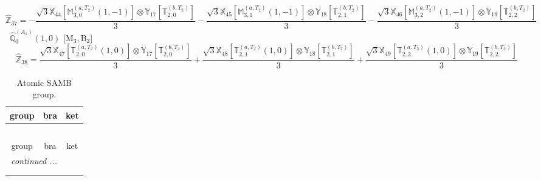 \documentclass[fleqn,10pt,landscape]{article}
\begin{document}
\begin{itemize}
\begin{dmath*}
\hat{\mathbb{Z}}_{37}=- \frac{\sqrt{3} \mathbb{X}_{44}[\mathbb{M}_{3,0}^{(a,T_{2})}(1,-1)] \otimes\mathbb{Y}_{17}[\mathbb{T}_{2,0}^{(b,T_{2})}]}{3} - \frac{\sqrt{3} \mathbb{X}_{45}[\mathbb{M}_{3,1}^{(a,T_{2})}(1,-1)] \otimes\mathbb{Y}_{18}[\mathbb{T}_{2,1}^{(b,T_{2})}]}{3} - \frac{\sqrt{3} \mathbb{X}_{46}[\mathbb{M}_{3,2}^{(a,T_{2})}(1,-1)] \otimes\mathbb{Y}_{19}[\mathbb{T}_{2,2}^{(b,T_{2})}]}{3}
\end{dmath*}
\vspace{4mm}
\noindent {} $\,\,\,\hat{\mathbb{Q}}_{0}^{(A_{1})}(1,0)$ [M$_{3}$,\,B$_{2}$]
\begin{dmath*}
\hat{\mathbb{Z}}_{38}=\frac{\sqrt{3} \mathbb{X}_{47}[\mathbb{T}_{2,0}^{(a,T_{2})}(1,0)] \otimes\mathbb{Y}_{17}[\mathbb{T}_{2,0}^{(b,T_{2})}]}{3} + \frac{\sqrt{3} \mathbb{X}_{48}[\mathbb{T}_{2,1}^{(a,T_{2})}(1,0)] \otimes\mathbb{Y}_{18}[\mathbb{T}_{2,1}^{(b,T_{2})}]}{3} + \frac{\sqrt{3} \mathbb{X}_{49}[\mathbb{T}_{2,2}^{(a,T_{2})}(1,0)] \otimes\mathbb{Y}_{19}[\mathbb{T}_{2,2}^{(b,T_{2})}]}{3}
\end{dmath*}
\begin{center}
\renewcommand{\arraystretch}{1.3}
\begin{longtable}{c|c|c}
\caption{Atomic SAMB group.}
 \\
 \hline \hline
group & bra & ket \\ \hline \endfirsthead

\multicolumn{2}{l}{\tablename\ \thetable{}} \\
 \hline \hline
group & bra & ket \\ \hline \endhead

 \hline \hline
\multicolumn{2}{r}{\footnotesize\it continued ...} \\ \endfoot

 \hline \hline
\multicolumn{2}{r}{} \\ \endlastfoot


\end{longtable}
\end{center}
\end{itemize}
\end{document}
